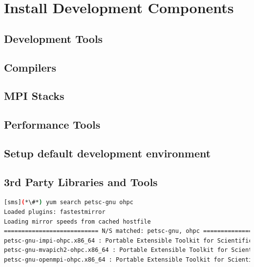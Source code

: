 \documentclass[letterpaper]{article}
\begin{document}
\section{Install \OHPC{} Development Components}


\subsection{Development Tools} \label{sec:install_dev_tools}


\subsection{Compilers} \label{sec:install_compilers}


\subsection{MPI Stacks} \label{sec:mpi}


\subsection{Performance Tools} \label{sec:install_perf_tools}


\subsection{Setup default development environment}



\vspace*{0.2cm}
\subsection{3rd Party Libraries and Tools} \label{sec:3rdparty}



\begin{lstlisting}[language=bash,keywords={}]
[sms](*\#*) yum search petsc-gnu ohpc
Loaded plugins: fastestmirror
Loading mirror speeds from cached hostfile
=========================== N/S matched: petsc-gnu, ohpc ===========================
petsc-gnu-impi-ohpc.x86_64 : Portable Extensible Toolkit for Scientific Computation
petsc-gnu-mvapich2-ohpc.x86_64 : Portable Extensible Toolkit for Scientific Computation
petsc-gnu-openmpi-ohpc.x86_64 : Portable Extensible Toolkit for Scientific Computation
\end{lstlisting}
\end{document}
